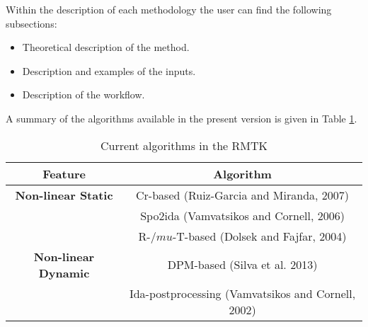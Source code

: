 Within the description of each methodology the user can find the following subsections:
\begin{itemize}
\item Theoretical description of the method.
\item Description and examples of the inputs.
\item Description of the workflow.
\end{itemize}

A summary of the algorithms available in the present version is given in Table \ref{tab:current_features}.
\begin{table}[!htbp]
\centering
\begin{tabular}{|c|c|} \hline
Feature & Algorithm\\ \hline
\textbf{Non-linear Static} & Cr-based (Ruiz-Garcia and Miranda, 2007)\\
    & Spo2ida (Vamvatsikos and Cornell, 2006) \\
    & R-$/mu$-T-based (Dolsek and Fajfar, 2004) \\ \hline
 \textbf{Non-linear Dynamic} & DPM-based (Silva et al. 2013)\\
  & Ida-postprocessing (Vamvatsikos and Cornell, 2002) \\ \hline
\end{tabular}
\caption{Current algorithms in the RMTK}
\label{tab:current_features}
\end{table}


